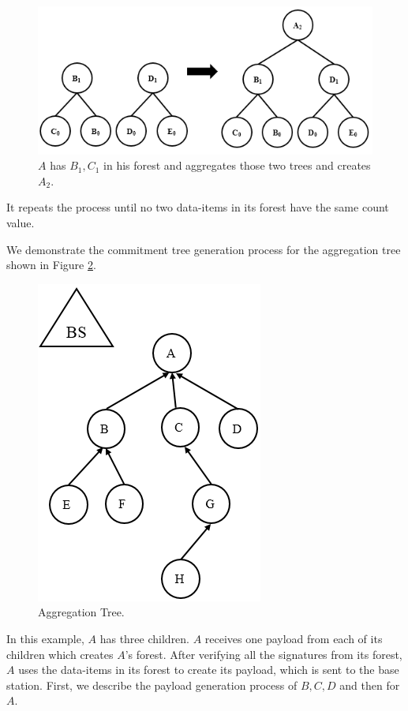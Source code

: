 	\begin{figure}[h!]
		\includegraphics[width=6in]{images/increase-height.png}
		\caption{$A$ has $B_{1}, C_{1}$ in his forest and aggregates those two trees and creates $A_{2}$.}
		\label{fig:increase-height}
	\end{figure}
	It repeats the process until no two data-items in its forest have the same count value.	
	
	We demonstrate the commitment tree generation process for the aggregation tree shown in Figure \ref{fig:Aggregation-tree-1}.
		\begin{figure}[h!]
			\centering
			\includegraphics[scale=1]{images/aggregation-tree-1.png}
			\caption{Aggregation Tree.}
			\label{fig:Aggregation-tree-1}
		\end{figure}
		In this example, $A$ has three children. $A$ receives one payload from each of its children which creates $A$'s forest.
		After verifying all the signatures from its forest, $A$ uses the data-items in its forest to create its payload, which is sent to the base station.
		First, we describe the payload generation process of $B,C,D$ and then for $A$.

